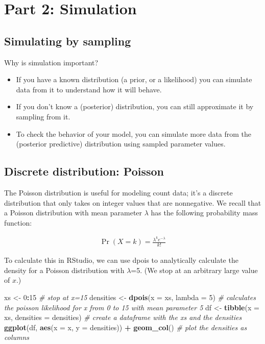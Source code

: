 \documentclass[]{article}
\newenvironment{Shaded}{\begin{snugshade}}{\end{snugshade}}
\newcommand{\KeywordTok}[1]{\textcolor[rgb]{0.13,0.29,0.53}{\textbf{#1}}}
\newcommand{\DataTypeTok}[1]{\textcolor[rgb]{0.13,0.29,0.53}{#1}}
\newcommand{\DecValTok}[1]{\textcolor[rgb]{0.00,0.00,0.81}{#1}}
\newcommand{\StringTok}[1]{\textcolor[rgb]{0.31,0.60,0.02}{#1}}
\newcommand{\CommentTok}[1]{\textcolor[rgb]{0.56,0.35,0.01}{\textit{#1}}}
\newcommand{\OperatorTok}[1]{\textcolor[rgb]{0.81,0.36,0.00}{\textbf{#1}}}
\newcommand{\NormalTok}[1]{#1}
\begin{document}
\section{Part 2: Simulation}\label{part-2-simulation}

\subsection{Simulating by sampling}\label{simulating-by-sampling}

Why is simulation important?

\begin{itemize}
\item
  If you have a known distribution (a prior, or a likelihood) you can
  simulate data from it to understand how it will behave.
\item
  If you don't know a (posterior) distribution, you can still
  approximate it by sampling from it.
\item
  To check the behavior of your model, you can simulate more data from
  the (posterior predictive) distribution using sampled parameter
  values.
\end{itemize}

\subsection{Discrete distribution:
Poisson}\label{discrete-distribution-poisson}

The Poisson distribution is useful for modeling count data; it's a
discrete distribution that only takes on integer values that are
nonnegative. We recall that a Poisson distribution with mean parameter
\(\lambda\) has the following probability mass function:

\begin{align*}
\operatorname{Pr}(X=k)=\frac{\lambda^{k} e^{-\lambda}}{k !}
\end{align*}

To calculate this in RStudio, we can use dpois to analytically calculate
the density for a Poisson distribution with \(\lambda\)=5. (We stop at
an arbitrary large value of \(x\).)

\begin{Shaded}
\begin{Highlighting}[]
\NormalTok{xs <-}\StringTok{ }\DecValTok{0}\OperatorTok{:}\DecValTok{15} \CommentTok{# stop at x=15}
\NormalTok{densities <-}\StringTok{ }\KeywordTok{dpois}\NormalTok{(}\DataTypeTok{x =}\NormalTok{ xs, }\DataTypeTok{lambda =} \DecValTok{5}\NormalTok{) }\CommentTok{# calculates the poisson likelihood for x from 0 to 15 with mean parameter 5}
\NormalTok{df <-}\StringTok{ }\KeywordTok{tibble}\NormalTok{(}\DataTypeTok{x =}\NormalTok{ xs, }\DataTypeTok{densities =}\NormalTok{ densities) }\CommentTok{# create a dataframe with the xs and the densities}
\KeywordTok{ggplot}\NormalTok{(df, }\KeywordTok{aes}\NormalTok{(}\DataTypeTok{x =}\NormalTok{ x, }\DataTypeTok{y =}\NormalTok{ densities)) }\OperatorTok{+}\StringTok{ }\KeywordTok{geom_col}\NormalTok{() }\CommentTok{# plot the densities as columns}
\end{Highlighting}
\end{Shaded}
\end{document}
